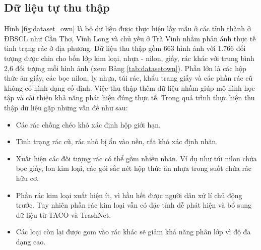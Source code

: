 \documentclass[../the.tex]{subfiles}
\begin{document}
\subsection{Dữ liệu tự thu thập}
\label{sec:own}
{\fontsize{13}{12} \selectfont

	Hình \ref{fig:dataset_own} là bộ dữ liệu được thực hiện lấy mẫu ở các tỉnh thành ở ĐBSCL như Cần Thơ, Vĩnh Long và chủ yếu ở Trà Vinh nhầm phản ánh thực tế tình trạng rác ở địa phương.
	Dữ liệu thu thập gồm 663 hình ảnh với 1.766 đối tượng được chia cho bốn lớp kim loại, nhựa - nilon, giấy, rác khác với trung bình 2,6 đối tượng mỗi hình ảnh (xem Bảng \ref{tab:datasetown}).
	Phần lớn là các hộp thức ăn giấy, các bọc nilon, ly nhựa, túi rác, khẩu trang giấy và các phần rác cũ không có hình dạng cố định.
	Việc thu thập thêm dữ liệu nhầm giúp mô hình học tập và cải thiện khả năng phát hiện đúng thực tế. Trong quá trình thực hiện thu thập dữ liệu gặp những vấn đề như sau:

	\begin{itemize}
		\item Các rác chồng chéo khó xác định hộp giới hạn.
		\item Tình trạng rác cũ, rác nhỏ bị ẩn vào nền, rất khó xác định nhãn.
		\item Xuất hiện các đối tượng rác có thể gồm nhiều nhãn. Ví dụ như túi nilon chứa bọc giấy, lon kim loại, các gói sắc nét hộp thức ăn nhựa trong suốt chứa rác hữu cơ.
		\item Phần rác kim loại xuất hiện ít, vì hầu hết được người dân xử lí chủ động trước. Tuy nhiên phần rác kim loại vẫn có đặc tính dễ phát hiện và bổ sung dữ liệu từ TACO \cite{proença2020taco} và TrashNet.
		\item Các loại còn lại được gom vào rác khác sẽ giảm khả năng phân lớp vì độ đa dạng cao.
	\end{itemize}

}
\end{document}
